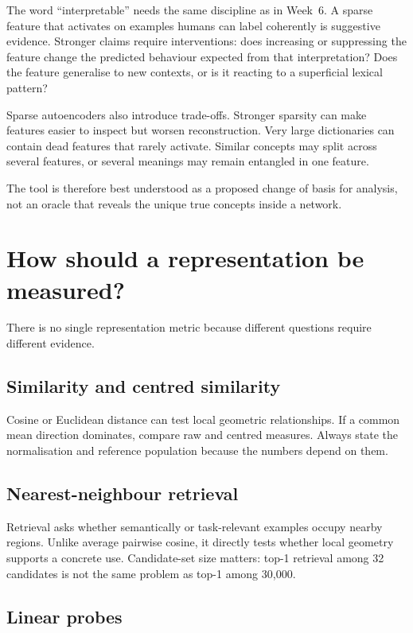 The word ``interpretable'' needs the same discipline as in Week~6. A sparse feature that activates on examples humans can label coherently is suggestive evidence. Stronger claims require interventions: does increasing or suppressing the feature change the predicted behaviour expected from that interpretation? Does the feature generalise to new contexts, or is it reacting to a superficial lexical pattern?

Sparse autoencoders also introduce trade-offs. Stronger sparsity can make features easier to inspect but worsen reconstruction. Very large dictionaries can contain dead features that rarely activate. Similar concepts may split across several features, or several meanings may remain entangled in one feature.

The tool is therefore best understood as a proposed change of basis for analysis, not an oracle that reveals the unique true concepts inside a network.

\section{How should a representation be measured?}

There is no single representation metric because different questions require different evidence.

\subsection{Similarity and centred similarity}

Cosine or Euclidean distance can test local geometric relationships. If a common mean direction dominates, compare raw and centred measures. Always state the normalisation and reference population because the numbers depend on them.

\subsection{Nearest-neighbour retrieval}

Retrieval asks whether semantically or task-relevant examples occupy nearby regions. Unlike average pairwise cosine, it directly tests whether local geometry supports a concrete use. Candidate-set size matters: top-1 retrieval among 32 candidates is not the same problem as top-1 among 30,000.

\subsection{Linear probes}


